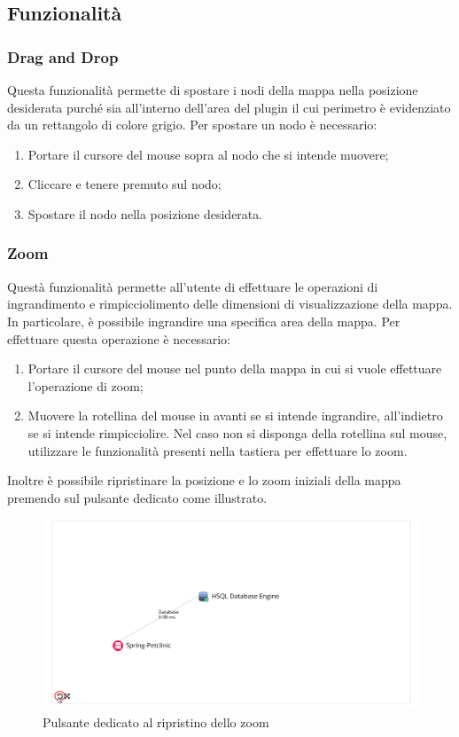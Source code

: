 \subsection{Funzionalità}
	\subsubsection {Drag and Drop} 
Questa funzionalità permette di spostare i nodi della mappa nella posizione desiderata purché sia all'interno dell'area del plugin il cui perimetro è evidenziato da un rettangolo di colore grigio.
Per spostare un nodo è necessario: 
\begin{enumerate}
	\item Portare il cursore del mouse sopra al nodo che si intende muovere;
	\item Cliccare e tenere premuto sul nodo;
	\item Spostare il nodo nella posizione desiderata.
\end{enumerate}


\subsubsection{Zoom}
Questà funzionalità permette all'utente di effettuare le operazioni di ingrandimento e rimpicciolimento delle dimensioni di visualizzazione della mappa. In particolare, è possibile ingrandire una specifica area della mappa.
Per effettuare questa operazione è necessario:
\begin{enumerate}
	\item Portare il cursore del mouse nel punto della mappa in cui si vuole effettuare l'operazione di zoom;
	\item Muovere la rotellina del mouse in avanti se si intende ingrandire, all'indietro se si intende rimpicciolire. Nel caso non si disponga della rotellina sul mouse, utilizzare le funzionalità presenti nella tastiera per effettuare lo zoom.
\end{enumerate}
Inoltre è possibile ripristinare la posizione e lo zoom iniziali della mappa premendo sul pulsante dedicato come illustrato.
\begin{figure}[H]
	\centering 
	\includegraphics[width=1\textwidth]{Images/zoom}
	\caption{Pulsante dedicato al ripristino dello zoom}
\end{figure}

